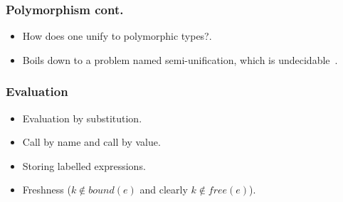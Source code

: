 \documentclass{beamer}
\begin{document}
\begin{frame}
\frametitle{Polymorphism cont.}
    \begin{itemize}
        \item How does one unify to polymorphic types?.
        \item Boils down to a problem named semi-unification, which is undecidable~\cite{WELLS1999111,NAMEHERE}.
    \end{itemize}
\end{frame}

\begin{frame}
\frametitle{Evaluation}
    \begin{itemize}
        \item Evaluation by substitution.
        \item Call by name and call by value.
        \item Storing labelled expressions.
        \item Freshness ($k \notin \textit{bound}(e)$ and clearly $k \notin \textit{free}(e)$).
    \end{itemize}
\end{frame}
\end{document}
